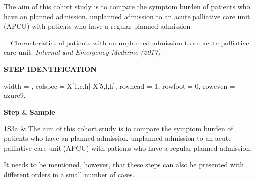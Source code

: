 \documentclass{ctexbook}
\begin{document}
\begin{sample}[label={myautocounter}]{\heiti}

  The aim of this cohort study is to compare the symptom burden of patients who have an planned admission. unplanned admission to an acute palliative care unit (APCU) with patients who have a regular planned admission.

  
  \begin{flushright}
    ---Characteristics of patients with an unplanned admission to an acute palliative care unit. \emph{Internal and Emergency Medicine (2017)}
  \end{flushright}

  \tcblower

  \noindent \textbf{STEP IDENTIFICATION}

  {\small
  \begin{longtblr}[
      caption = {Common Prefixes},
      label = {tab:Common_Prefixes},
  ]{
      width = \textwidth,
      colspec = {X[1,c,h]  X[5,l,h]},
      rowhead = 1, rowfoot = 0, %
      row{even} = {azure9},
  }
      
    \toprule
    \textbf{Step} & \textbf{Sample} \\ 
    \midrule
    
     1S3a & The aim of this cohort study is to compare the symptom burden of patients who have an planned admission. unplanned admission to an acute palliative care unit (APCU) with patients who have a regular planned admission. \\

    \bottomrule

  \end{longtblr}
  }

\end{sample}

It needs to be mentioned, however, that these steps can also be presented with different orders in a small number of cases.
\end{document}
